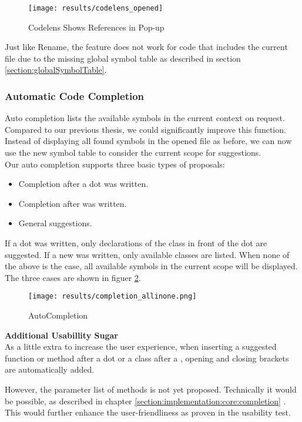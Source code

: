 \begin{figure}[H]
    \centering
    \texttt{[image: results/codelens\_opened]}
    \caption{Codelens Shows References in Pop-up}
    \label{fig:result_codelens_references_popup}
\end{figure}

Just like Rename, the feature does not work for code that includes the current file
due to the missing global symbol table as described in section \ref{section:globalSymbolTable}.

\subsubsection{Automatic Code Completion}
Auto completion lists the available symbols in the current context on request.
Compared to our previous thesis, we could significantly improve this function.
Instead of displaying all found symbols in the opened file as before,
we can now use the new symbol table to consider the current scope for suggestions. \\

Our auto completion supports three basic types of proposals:
\begin{itemize}
    \item Completion after a dot was written.
    \item Completion after  was written.
    \item General suggestions.
\end{itemize}

If a dot was written, only declarations of the class in front of the dot are suggested.
If a new was written, only available classes are listed.
When none of the above is the case, all available symbols in the current scope will be displayed.
The three cases are shown in figuer \ref{fig:result_completion}.

\begin{figure}[H]
    \centering
    \texttt{[image: results/completion\_allinone.png]}
    \caption{AutoCompletion}
    \label{fig:result_completion}
\end{figure}

\textbf{Additional Usabillity Sugar}\\
As a little extra to increase the user experience, when inserting a suggested function or method after a dot
or a class after a ,
opening and closing brackets are automatically added.

However, the parameter list of methods is not yet proposed.
Technically it would be possible, as described in chapter
\ref{section:implementation:core:completion} \textendash{} .
This would further enhance the user-friendliness as proven in the usability test.

